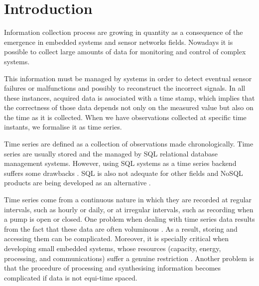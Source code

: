 


\section{Introduction}

Information collection process are growing in quantity as a
consequence of the emergence in embedded systems and sensor networks
fields.  Nowadays it is possible to collect large amounts of data for
monitoring and control of complex systems.  

This information must be managed by systems in order to detect
eventual sensor failures or malfunctions and possibly to reconstruct
the incorrect signals. In all these instances, acquired data is
associated with a time stamp, which implies that the correctness of
those data depends not only on the measured value but also on the time
as it is collected. When we have observations collected at specific
time instants, we formalise it as time series.

Time series are defined as a collection of observations made
chronologically. Time series are usually stored and the
managed by SQL relational database management systems. However, using
SQL systems as a time series backend suffers some drawbacks
\cite{dreyer94,schmidt95,stonebraker09:scidb,zhang11}. SQL is also not
adequate for other fields and NoSQL products are being developed as an
alternative \cite{atzeni13:relational_model_dead,stonebraker10}.

Time series come from a continuous nature in which they are recorded
at regular intervals, such as hourly or daily, or at irregular
intervals, such as recording when a pump is open or closed.  One
problem when dealing with time series data results from the fact that
these data are often voluminous \cite{fu11,keogh08:isax}. As a result,
storing and accessing them can be complicated. Moreover, it is
specially critical when developing small embedded systems, whose
resources (capacity, energy, processing, and communications) suffer a
genuine restriction \cite{yaogehrke02}.  Another problem is that the
procedure of processing and synthesising information becomes
complicated if data is not equi-time spaced.







